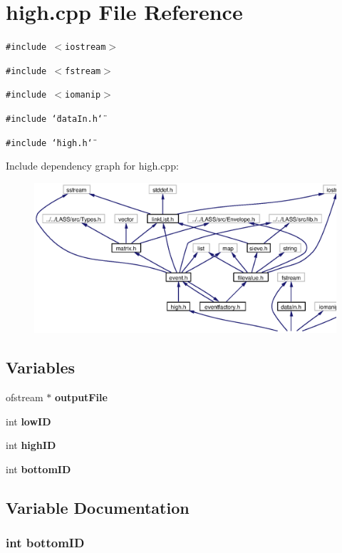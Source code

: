 \section{high.cpp File Reference}
\label{high_8cpp}
{\tt \#include $<$iostream$>$}\par
{\tt \#include $<$fstream$>$}\par
{\tt \#include $<$iomanip$>$}\par
{\tt \#include \char`\"{}data\-In.h\char`\"{}}\par
{\tt \#include \char`\"{}high.h\char`\"{}}\par


Include dependency graph for high.cpp:\begin{figure}[H]
\begin{center}
\leavevmode
\includegraphics[width=323pt]{high_8cpp__incl}
\end{center}
\end{figure}
\subsection*{Variables}
\begin{CompactItemize}
\item 
ofstream $\ast$ {\bf output\-File}
\item 
int {\bf low\-ID}
\item 
int {\bf high\-ID}
\item 
int {\bf bottom\-ID}
\end{CompactItemize}


\subsection{Variable Documentation}
\subsubsection{\setlength{\rightskip}{0pt plus 5cm}int {\bf bottom\-ID}}\label{high_8cpp_a3}




